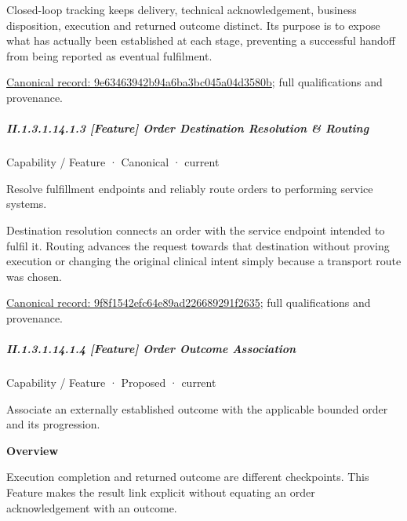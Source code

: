 Closed-loop tracking keeps delivery, technical acknowledgement, business disposition, execution and returned outcome distinct. Its purpose is to expose what has actually been established at each stage, preventing a successful handoff from being reported as eventual fulfilment.


{\footnotesize \href{../../../../continuum/strategy/capability/feature/9e63463942b94a6ba3bc045a04d3580b.md}{Canonical record: 9e63463942b94a6ba3bc045a04d3580b}; full qualifications and provenance.}\par
\subparagraph*{II.1.3.1.14.1.3 [Feature] Order Destination Resolution \& Routing}
\label{navigation:II.1.3.1.14.1.3}

\label{element:9f8f1542efc64e89ad226689291f2635}
{\small Capability / Feature · Canonical · current}\par

Resolve fulfillment endpoints and reliably route orders to performing service systems.



Destination resolution connects an order with the service endpoint intended to fulfil it. Routing advances the request towards that destination without proving execution or changing the original clinical intent simply because a transport route was chosen.


{\footnotesize \href{../../../../continuum/strategy/capability/feature/9f8f1542efc64e89ad226689291f2635.md}{Canonical record: 9f8f1542efc64e89ad226689291f2635}; full qualifications and provenance.}\par
\subparagraph*{II.1.3.1.14.1.4 [Feature] Order Outcome Association}
\label{navigation:II.1.3.1.14.1.4}

\label{element:4ad2e11162f34775adfea01b949d2803}
{\small Capability / Feature · Proposed · current}\par

Associate an externally established outcome with the applicable bounded order and its progression.



\textbf{Overview}



Execution completion and returned outcome are different checkpoints. This Feature makes the result link explicit without equating an order acknowledgement with an outcome.



